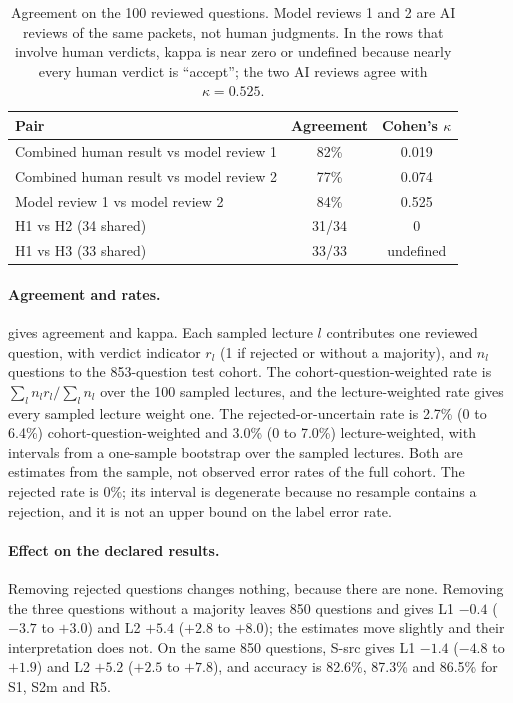 \begin{table}[t]
\centering
\small
\setlength{\tabcolsep}{4pt}
\begin{tabular}{@{}lcc@{}}
\toprule
Pair & Agreement & Cohen's $\kappa$ \\
\midrule
Combined human result vs model review 1 & 82\% & 0.019 \\
Combined human result vs model review 2 & 77\% & 0.074 \\
Model review 1 vs model review 2 & 84\% & 0.525 \\
H1 vs H2 (34 shared) & 31/34 & 0 \\
H1 vs H3 (33 shared) & 33/33 & undefined \\
\bottomrule
\end{tabular}
\caption{Agreement on the 100 reviewed questions. Model reviews 1 and 2 are AI reviews of the same packets, not human judgments. In the rows that involve human verdicts, kappa is near zero or undefined because nearly every human verdict is ``accept''; the two AI reviews agree with $\kappa{=}0.525$.}
\label{tab:s-agreement}
\end{table}

\paragraph{Agreement and rates.}
 gives agreement and kappa.
Each sampled lecture $l$ contributes one reviewed question, with verdict indicator $r_l$ (1 if rejected or without a majority), and $n_l$ questions to the 853-question test cohort.
The cohort-question-weighted rate is $\sum_l n_l r_l / \sum_l n_l$ over the 100 sampled lectures, and the lecture-weighted rate gives every sampled lecture weight one.
The rejected-or-uncertain rate is 2.7\% (0 to 6.4\%) cohort-question-weighted and 3.0\% (0 to 7.0\%) lecture-weighted, with intervals from a one-sample bootstrap over the sampled lectures.
Both are estimates from the sample, not observed error rates of the full cohort.
The rejected rate is 0\%; its interval is degenerate because no resample contains a rejection, and it is not an upper bound on the label error rate.

\paragraph{Effect on the declared results.}
Removing rejected questions changes nothing, because there are none.
Removing the three questions without a majority leaves 850 questions and gives L1 $-0.4$ ($-3.7$ to $+3.0$) and L2 $+5.4$ ($+2.8$ to $+8.0$); the estimates move slightly and their interpretation does not.
On the same 850 questions, S-src gives L1 $-1.4$ ($-4.8$ to $+1.9$) and L2 $+5.2$ ($+2.5$ to $+7.8$), and accuracy is 82.6\%, 87.3\% and 86.5\% for S1, S2m and R5.

